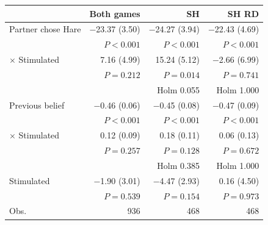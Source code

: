\small
\begin{tabular}{lrrr}
\toprule
& Both games & SH & SH RD \\
\midrule
Partner chose Hare & $-$23.37 (3.50) & $-$24.27 (3.94) & $-$22.43 (4.69) \\
 & $P<0.001$ & $P<0.001$ & $P<0.001$ \\
\quad $\times$ Stimulated & 7.16 (4.99) & 15.24 (5.12) & $-$2.66 (6.99) \\
 & $P=0.212$ & $P=0.014$ & $P=0.741$ \\
 &  & Holm 0.055 & Holm 1.000 \\
Previous belief & $-$0.46 (0.06) & $-$0.45 (0.08) & $-$0.47 (0.09) \\
 & $P<0.001$ & $P<0.001$ & $P<0.001$ \\
\quad $\times$ Stimulated & 0.12 (0.09) & 0.18 (0.11) & 0.06 (0.13) \\
 & $P=0.257$ & $P=0.128$ & $P=0.672$ \\
 &  & Holm 0.385 & Holm 1.000 \\
Stimulated & $-$1.90 (3.01) & $-$4.47 (2.93) & 0.16 (4.50) \\
 & $P=0.539$ & $P=0.154$ & $P=0.973$ \\
Obs. & 936 & 468 & 468 \\
\bottomrule
\end{tabular}
